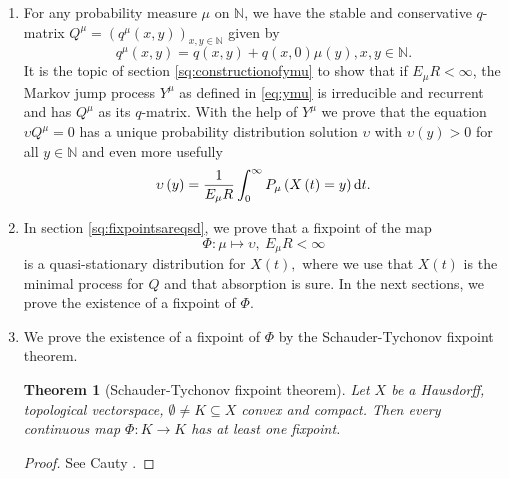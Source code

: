 \documentclass[12pt,a4paper]{scrartcl}
\newtheorem{theorem}{Theorem}[section]
\numberwithin{equation}{section}
\newcommand{\N}{\mathbb{N}} %
\begin{document}
\begin{enumerate}
\item For any probability measure $\mu$ on $\N$, we have the stable and conservative $q$-matrix $Q^{\mu}=\left(q^{\mu}\left(x,y\right)\right)_{x,y \in \N}$ given by
\begin{equation} \label{eq:qmu}
q^{\mu}\left(x,y\right) = q\left(x,y\right) + q\left(x,0\right) \mu\left(y\right) , x,y \in \N.
\end{equation}
It is the topic of section \ref{sq:constructionofymu} to show that if $E_{\mu} R < \infty$, the Markov jump process $Y^{\mu}$ as defined in \eqref{eq:ymu} is irreducible and recurrent and has $Q^{\mu}$ as its $q$-matrix. With the help of $Y^{\mu}$ we prove that the equation $ \upsilon Q^{\mu} = 0 $ has a unique probability distribution solution $\upsilon$ with $\upsilon\left(y\right) > 0$ for all $y \in \N$ and even more usefully
\begin{equation} \label{eq:linktoxt}
\upsilon\left(y\right) = \frac{1}{E_{\mu} R} \int_0^{\infty} P_{\mu} \left(X\left(t\right) = y  \right) \textnormal{d}t.
\end{equation}

\item In section \ref{sq:fixpointsareqsd}, we prove that a fixpoint of the map
\begin{equation}
\Phi: \mu \mapsto \upsilon, \ E_{\mu} R < \infty
\end{equation}
is a quasi-stationary distribution for $X\left(t\right),$ where we use that $X\left(t\right)$ is the minimal process for $Q$ and that absorption is sure. In the next sections, we prove the existence of a fixpoint of $\Phi.$
\item We prove the existence of a fixpoint of $\Phi$ by the Schauder-Tychonov fixpoint theorem.
\begin{theorem} [Schauder-Tychonov fixpoint theorem]
Let $X$ be a Hausdorff, topological vectorspace,  $\emptyset \neq K \subseteq X$ convex and  compact. Then every continuous map $ \Phi: K \to K $ has at least one fixpoint.
\end{theorem}
\begin{proof}
See Cauty \cite{cauty}.
\end{proof} 


\end{enumerate}
\end{document}
